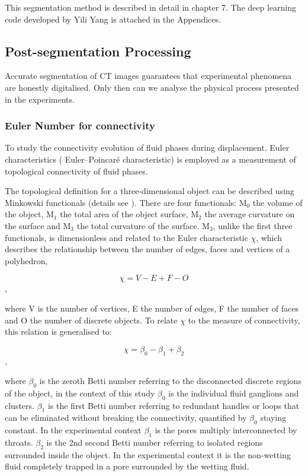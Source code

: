 This segmentation method is described in detail in chapter 7. The deep learning code developed by Yili Yang is attached in the Appendices.

\subsection{Post-segmentation Processing}
Accurate segmentation of CT images guarantees that experimental phenomena are honestly digitalised. Only then can we analyse the physical process presented in the experiments. 
\subsubsection{Euler Number for connectivity}
To study the connectivity evolution of fluid phases during displacement, Euler characteristics ( Euler--Poincar\'e characteristic) is employed as a measurement of topological connectivity of fluid phases. 

The topological definition for a three-dimensional object can be described using Minkowski functionals (details see \cite{blunt2017multiphase,mecke2005fluids}). There are four functionals: M$_0$ the volume of the object, M$_1$ the total area of the object surface, M$_2$ the average curvature on the surface and M$_3$ the total curvature of the surface. M$_3$, unlike the first three functionals, is dimensionless and related to the Euler characteristic $\chi$, which describes the relationship between the number of edges, faces and vertices of a polyhedron,

$$\chi = V-E+F-O$$,

where V is the number of vertices, E the number of edges, F the number of faces and O the number of discrete objects. To relate $\chi$ to the measure of connectivity, this relation is generalised \citep{serra1986introduction,vogel2001quantitative,vogel2002topological} to: 

$$\chi=\beta_0-\beta_1+\beta_2$$,

where $\beta_0$ is the zeroth Betti number referring to the disconnected discrete regions of the object, in the context of this study $\beta_0$ is the individual fluid ganglions and clusters. $\beta_1$ is the first Betti number referring to redundant handles or loops that can be eliminated without breaking the connectivity, quantified by $\beta_0$ staying constant. In the experimental context $\beta_1$ is the pores multiply interconnected by throats. $\beta_2$ is the 2nd second Betti number referring to isolated regions surrounded inside the object. In the experimental context it is the non-wetting fluid completely trapped in a pore surrounded by the wetting fluid.

